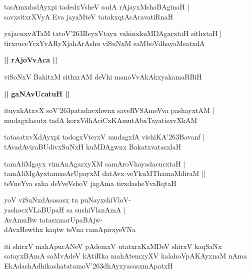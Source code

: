 \documentclass[twoside,12pt,openright]{book}
\def\S{\char'263}
\newcounter{shloka}[chapter]
\def\uvaca#1{\centerline{{\large\textbf{#1}}}}
\begin{document}
\begin{shloka}%
tasAmxdadAyxpi tadedxVsheV sadA rAjayxMshaBAginaH |\\
savxsitxrXVyA Eva jayaMteV tatakxqtAcAravatiRnaH 
\end{shloka}

\begin{shloka}%
yajacnxvATaM tatoV\S BeyxVtayx vahinxkuMDAgarxtaH sithxtaH |\\
tirxruceYcxYvARyXjahArAshu viSuNxM saMboVdhayaMsatxdA 
\end{shloka}

\uvaca{|| rAjoVvAca ||}

\begin{shloka}%
viSoNxV BakitxM sithxrAM deVhi manoVvAkAkxyakamaRBiH 
\end{shloka}

\uvaca{|| gaNAvUcatuH ||}

\begin{shloka}%
ituyxkAtxvX soV\S patadavxhwnx saveRVSAmeVva pashayxtAM |\\
mudagxlasutx tadA korxVdhAciCxKAmutAbxTayatisxvXkAM 
\end{shloka}

\begin{shloka}%
tatasatxvXdAyxpi tadogxVterxV mudagxlA vishiKA\S Bavanf |\\
tAvadAviraBUdivxSuNxH kuMDAgwnx BakatxvatasxlaH 
\end{shloka}

\begin{shloka}%
tamAliMgayx vimAnAgarxyXM samAroVhayadacucxtaH |\\
tamAliMgAyxtamxsArUpayxM datAvx veYkuMThamaMdiraM ||\\
teVneYva saha deVveVshoV jagAma tirxdasheYvaRqtaH 
\end{shloka}

\begin{shloka}%
yoV viSuNxdAsasasx tu puNayxshiVloV- \\
yashocxVLaBUpaH sa sushiVlanAmA |\\
AvAmuBw tatasxmarUpaBAjw- \\
dAvxHswthx kaqtw teVna ramApirxyeVNa
\end{shloka}

\begin{center}
iti shirxV mahApurANeV pAdemxV utatxraKaMDeV shirxV kaqSaNx satayxBAmA saMvAdeV kAtiRka 
mahAtemxyXV kalahoVpAKAyxnaM nAma EkAdashAdhikashatatamoV\S dhAyxyasasxmApatxH 
\end{center}
\end{document}
